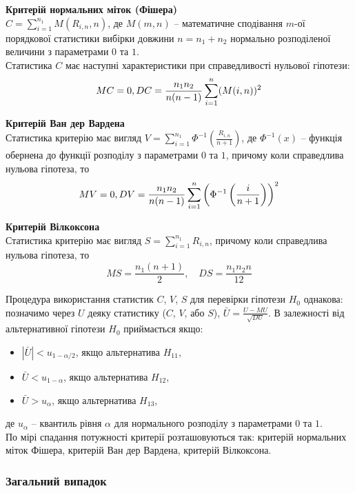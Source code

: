 \textbf{Критерій нормальних міток (Фішера)} \\

$C = \sum_{i=1}^{n_1} M(R_{i, n}, n)$, де $M(m, n)$ -- математичне сподівання $m$-ої порядкової статистики вибірки довжини $n = n_1 + n_2$ нормально розподіленої величини з параметрами $0$ та $1$. \\

Статистика $C$ має наступні характеристики при справедливості нульової гіпотези:
\[ M C = 0, D C = \dfrac{n_1 n_2}{n(n-1)} \displaystyle\sum\limits_{i=1}^n (M(i, n))^2 \]

\textbf{Критерій Ван дер Вардена} \\

Статистика критерію має вигляд $ V = \sum_{i=1}^{n_1} \Phi^{-1} \left( \frac{R_{i,n}}{n+1} \right)$, де $\Phi^{-1}(x)$ -- функція обернена до функції розподілу з параметрами $0$ та $1$, причому коли справедлива нульова гіпотеза, то
\[ M V = 0, DV = \dfrac{n_1 n_2}{n(n-1)} \displaystyle\sum\limits_{i=1}^n \left( \Phi^{-1} \left( \dfrac{i}{n+1} \right) \right)^2 \]

\textbf{Критерій Вілкоксона} \\

Статистика критерію має вигляд $S = \sum_{i=1}^{n_1} R_{i,n}$, причому коли справедлива нульова гіпотеза, то
\[ MS = \dfrac{n_1(n + 1)}{2}, \quad DS = \dfrac{n_1 n_2 n}{12} \]

Процедура використання статистик $C$, $V$, $S$ для перевірки гіпотези $H_0$ однакова: позначимо через $U$ деяку статистику ($C$, $V$, або $S$), $\bar{U} = \frac{U - M U}{\sqrt{D U}}$. В залежності від альтернативної гіпотези $H_0$ приймається якщо:
\begin{itemize}
    \item $|\bar{U}| < u_{1 - \alpha / 2}$, якщо альтернатива $H_{11}$,
    
    \item $\bar{U} < u_{1 - \alpha}$, якщо альтернатива $H_{12}$,
    
    \item $\bar{U} > u_\alpha$, якщо альтернатива $H_{13}$,
\end{itemize}
де $u_\alpha$ -- квантиль рівня $\alpha$ для нормального розподілу з параметрами $0$ та $1$. \\

По мірі спадання потужності критерії розташовуються так: критерій нормальних міток Фішера, критерій Ван дер Вардена, критерій Вілкоксона.

\subsubsection{Загальний випадок}


